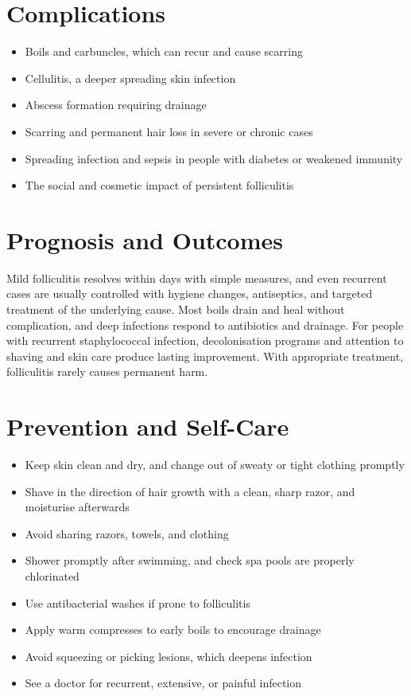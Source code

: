 \section*{Complications}
\begin{itemize}
    \item Boils and carbuncles, which can recur and cause scarring
    \item Cellulitis, a deeper spreading skin infection
    \item Abscess formation requiring drainage
    \item Scarring and permanent hair loss in severe or chronic cases
    \item Spreading infection and sepsis in people with diabetes or weakened immunity
    \item The social and cosmetic impact of persistent folliculitis
\end{itemize}

\section*{Prognosis and Outcomes}
Mild folliculitis resolves within days with simple measures, and even recurrent cases are usually controlled with hygiene changes, antiseptics, and targeted treatment of the underlying cause. Most boils drain and heal without complication, and deep infections respond to antibiotics and drainage. For people with recurrent staphylococcal infection, decolonisation programs and attention to shaving and skin care produce lasting improvement. With appropriate treatment, folliculitis rarely causes permanent harm.

\section*{Prevention and Self-Care}
\begin{itemize}
    \item Keep skin clean and dry, and change out of sweaty or tight clothing promptly
    \item Shave in the direction of hair growth with a clean, sharp razor, and moisturise afterwards
    \item Avoid sharing razors, towels, and clothing
    \item Shower promptly after swimming, and check spa pools are properly chlorinated
    \item Use antibacterial washes if prone to folliculitis
    \item Apply warm compresses to early boils to encourage drainage
    \item Avoid squeezing or picking lesions, which deepens infection
    \item See a doctor for recurrent, extensive, or painful infection
\end{itemize}

